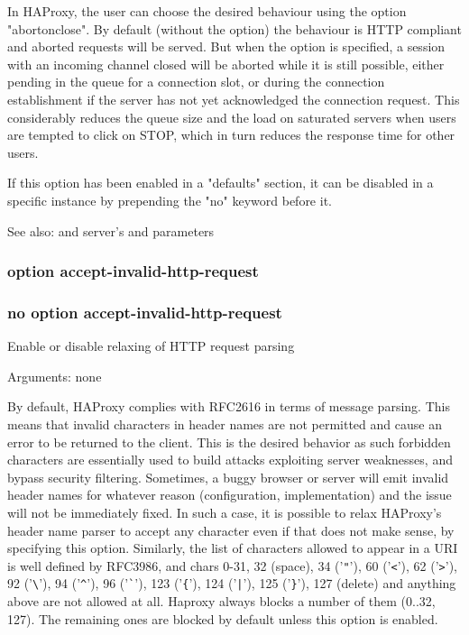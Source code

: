   In HAProxy, the user can choose the desired behaviour using the option
  "abortonclose". By default (without the option) the behaviour is HTTP
  compliant and aborted requests will be served. But when the option is
  specified, a session with an incoming channel closed will be aborted while
  it is still possible, either pending in the queue for a connection slot, or
  during the connection establishment if the server has not yet acknowledged
  the connection request. This considerably reduces the queue size and the load
  on saturated servers when users are tempted to click on STOP, which in turn
  reduces the response time for other users.

  If this option has been enabled in a "defaults" section, it can be disabled
  in a specific instance by prepending the "no" keyword before it.

  See also:  and server's  and  parameters

\subsubsection{option accept-invalid-http-request}
\subsubsection{no option accept-invalid-http-request}
  Enable or disable relaxing of HTTP request parsing


  Arguments: none

  By default, HAProxy complies with RFC2616 in terms of message parsing. This
  means that invalid characters in header names are not permitted and cause an
  error to be returned to the client. This is the desired behavior as such
  forbidden characters are essentially used to build attacks exploiting server
  weaknesses, and bypass security filtering. Sometimes, a buggy browser or
  server will emit invalid header names for whatever reason (configuration,
  implementation) and the issue will not be immediately fixed. In such a case,
  it is possible to relax HAProxy's header name parser to accept any character
  even if that does not make sense, by specifying this option. Similarly, the
  list of characters allowed to appear in a URI is well defined by RFC3986, and
  chars 0-31, 32 (space), 34 ('\verb|"|'), 60 ('\verb|<|'), 62 ('\verb|>|'), 92 ('\verb|\|'), 94 ('\verb|^|'), 96
  ('\verb|`|'), 123 ('\verb|{|'), 124 ('\verb:|:'), 125 ('\verb|}|'), 127 (delete) and anything above are
  not allowed at all. Haproxy always blocks a number of them (0..32, 127). The
  remaining ones are blocked by default unless this option is enabled.


